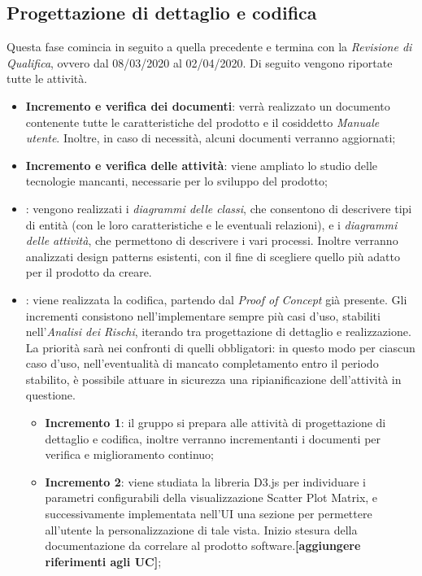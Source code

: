 \subsection{Progettazione di dettaglio e codifica}
Questa fase comincia in seguito a quella precedente e termina con la \textit{Revisione di Qualifica}, ovvero dal 08/03/2020 al 02/04/2020. Di seguito vengono riportate tutte le attività.

\begin{itemize}
	\item \textbf{Incremento e verifica dei documenti}: verrà realizzato un documento contenente tutte le caratteristiche del prodotto e il cosiddetto \textit{Manuale utente}. Inoltre, in caso di necessità, alcuni documenti verranno aggiornati;
	\item \textbf{Incremento e verifica delle attività}: viene ampliato lo studio delle tecnologie mancanti, necessarie per lo sviluppo del prodotto; 
	\item \textbf{}: vengono realizzati i \textit{diagrammi delle classi}, che consentono di descrivere tipi di entità (con le loro caratteristiche e le eventuali relazioni), e i \textit{diagrammi delle attività}, che permettono di descrivere i vari processi. Inoltre verranno analizzati design patterns esistenti, con il fine di scegliere quello più adatto per il prodotto da creare.
	\item \textbf{}: viene realizzata la codifica, partendo dal \textit{Proof of Concept} già presente. Gli incrementi consistono nell'implementare sempre più casi d'uso, stabiliti nell'\textit{Analisi dei Rischi}, iterando tra progettazione di dettaglio e realizzazione. La priorità sarà nei confronti di quelli obbligatori: in questo modo per ciascun caso d'uso, nell'eventualità di mancato completamento entro il periodo stabilito, è possibile attuare in sicurezza una ripianificazione dell'attività in questione. \\
	
	\begin{itemize}
	\item \textbf{Incremento 1}: il gruppo si prepara alle attività di progettazione di dettaglio e codifica, inoltre verranno incrementanti i documenti per verifica e miglioramento continuo;
	
	\item \textbf{Incremento 2}: viene studiata la libreria D3.js per individuare i parametri configurabili della visualizzazione Scatter Plot Matrix, e successivamente implementata nell'UI una sezione per permettere all'utente la personalizzazione di tale vista. Inizio stesura della documentazione da correlare al prodotto software.\textbf{[aggiungere riferimenti agli UC]};
	

\end{itemize}
\end{itemize}
